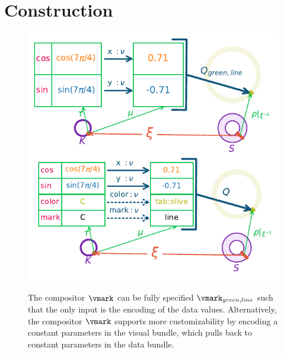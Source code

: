 \documentclass[preprint]{vgtc}
\begin{document}
\section{Construction}
\begin{figure}[!h]
  \includegraphics[width=1\columnwidth, alt={cos(i) and sin(i) gets encoded as x and y values that for a patch of a green circle. That the visual mark is a green line can either be encoded in the compositor function or passed to the compositor function as part of the encoding spec. Green and line can be pulled back to represent constant parameters of the data.}]{construction.pdf}
  \caption{The compositor $\vmark$ can be fully specified $\vmark_{green,line}$ such that the only input is the encoding of the data values. Alternatively, the compositor $\vmark$ supports more customizability by encoding  a constant parameters in the visual bundle, which pulls back to constant parameters in the data bundle.}\label{fig:construction:q}
\end{figure}
\end{document}
